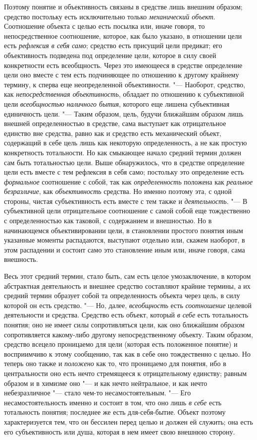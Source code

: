 {{Поэтому понятие и объективность связаны в средстве лишь
внешним образом; средство постольку есть исключительно только
{\em механический объект}.
Соотношение объекта с целью есть посылка или, иначе говоря,
то непосредственное соотношение, которое, как было указано, в отношении
цели есть {\em рефлексия в себя само};
средство есть присущий цели предикат; его объективность
подведена под определение цели, которое в силу своей конкретности есть
всеобщность. Через это имеющееся в средстве определение цели оно вместе с
тем есть подчиняющее по отношению к другому крайнему термину, к сперва еще
неопределенной объективности. "--- Наоборот, средство, как
{\em непосредственная объективность},
обладает по отношению к субъективной цели
{\em всеобщностью наличного бытия},
которого еще лишена субъективная единичность цели. "---
Таким образом, цель, будучи ближайшим образом лишь внешней
определенностью в средстве, сама выступает как отрицательное единство вне
средства, равно как и средство есть механический объект, содержащий в себе
цель лишь как некоторую определенность, а не как простую конкретность
тотальности. Но как смыкающее начало средний термин должен сам быть
тотальностью цели. Выше обнаружилось, что в средстве определение цели есть
вместе с тем рефлексия в себя само; постольку это определение есть
{\em формальное}
соотношение с собой, так как
{\em определенность}
положена как {\em реальное
безразличие}, как
{\em объективность}
средства. Но именно поэтому эта, с одной стороны, чистая
субъективность есть вместе с тем также и
{\em деятельность}. "--- В
субъективной цели отрицательное соотношение с самой собой еще тождественно
с определенностью как таковой, с содержанием и внешностью. Но в
начинающемся объективировании цели, в становлении простого понятия иным
указанные моменты распадаются, выступают отдельно или, скажем наоборот, в
этом распадении и состоит само это становление иным или, иначе говоря, сама
внешность.

Весь этот средний термин, стало быть, сам есть целое
умозаключение, в котором абстрактная деятельность и внешнее средство
составляют крайние термины, а их средний термин образует собой та
определенность объекта через цель, в силу которой он есть средство. "---
Но, далее,
{\em всеобщность} есть
{\em соотношение} целевой
деятельности и средства. Средство есть объект, который
{\em в себе} есть
тотальность понятия; оно не имеет силы сопротивляться цели, как оно
ближайшим образом сопротивляется какому-либо другому непосредственному
объекту. Таким образом, средство всецело проницаемо для цели (которая есть
положенное понятие) и восприимчиво к этому сообщению, так как в себе оно
тождественно с целью. Но теперь оно также и
{\em положено} как то,
что проницаемо для понятия, ибо в центральности оно есть нечто стремящееся
к отрицательному единству; равным образом и в химизме оно
"--- и как нечто нейтральное, и как нечто небезразличное
"--- стало чем-то несамостоятельным. "--- Его
несамостоятельность именно и состоит в том, что оно лишь
{\em в себе} есть
тотальность понятия; последнее же есть для-себя-бытие. Объект поэтому
характеризуется тем, что он бессилен перед целью и должен ей служить; она
есть его субъективность или душа, которая в нем имеет свою внешнюю сторону.

}}
